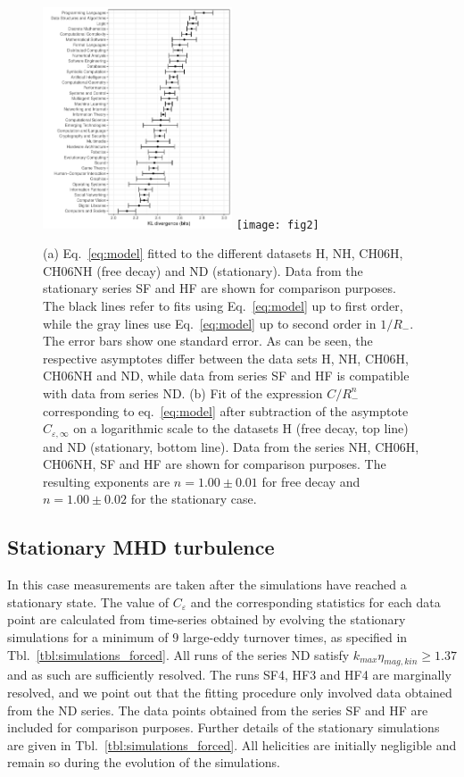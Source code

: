 \documentclass[aps,pre,onecolumn,superscriptaddress,notitlepage]{revtex4-1}
\newcommand{\Ceps}{C_\varepsilon}
\newcommand{\Cinf}{C_{\varepsilon,\infty}}
\newcommand{\blue}[1]{{#1}}
\begin{document}
\begin{figure}[!t]
 \begin{center}
\hspace{-2em} 
 \includegraphics[width=0.5\textwidth]{fig1}
\hspace{-2em} 
\texttt{[image: fig2]}
 \caption{
  \blue{(a)} Eq.~\eqref{eq:model} fitted to the different datasets H, NH, CH06H, CH06NH (free decay) and ND (stationary). 
  Data from the stationary series SF and HF are shown for comparison purposes.
  The black lines refer to fits using Eq.~\eqref{eq:model} up to
  first order, while the gray lines use Eq.~\eqref{eq:model} up to second order in
  $1/R_-$. 
  The error bars show one standard error. 
  As can be seen, the respective asymptotes differ between the data sets H, NH, CH06H, CH06NH and ND, 
  while data from series SF and HF is compatible with data from series ND.
  \blue{(b) Fit of the expression $C/R_-^n$ corresponding to eq.~\eqref{eq:model} after 
   subtraction of the asymptote $\Cinf$ on a logarithmic scale to
   the datasets H (free decay, top line) and ND (stationary, bottom line). 
   Data from the series NH, CH06H, CH06NH, SF and HF are shown for comparison purposes. The 
   resulting exponents are $n=1.00 \pm 0.01$ for free decay and $n=1.00 \pm 0.02$ for the stationary 
   case.} 
 }
 \label{fig:comp_all}
 \end{center}
\end{figure}


\subsection{Stationary MHD turbulence}
\label{sec:stationary}
In this case measurements are taken after the simulations
have reached a stationary state. The value of $\Ceps$ and the corresponding statistics 
for each data point are calculated from time-series obtained by evolving the 
stationary simulations for a minimum of $9$ large-eddy turnover times, as specified in 
Tbl.~\ref{tbl:simulations_forced}. 
All runs of the series ND satisfy $k_{max}\eta_{mag,kin} \geqslant 1.37$ 
and as such are sufficiently resolved.
The runs SF4, HF3 and HF4 are marginally resolved, and 
we point out that the fitting procedure only involved data obtained from the ND series. The 
data points obtained from the series SF and HF are included for comparison purposes. 
Further details of the stationary simulations are given in Tbl.~\ref{tbl:simulations_forced}.   
All helicities are initially negligible and remain so during the evolution of the simulations. 
\end{document}
